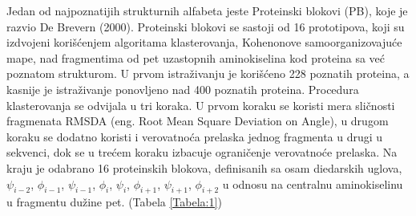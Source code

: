 \documentclass[a4paper,12pt]{article}
\begin{document}
Jedan od najpoznatijih strukturnih alfabeta jeste Proteinski blokovi (PB), koje je razvio De Brevern (2000). Proteinski blokovi se sastoji od 16 prototipova, koji su izdvojeni korišćenjem algoritama klasterovanja, Kohenonove samoorganizovajuće mape, nad fragmentima od pet uzastopnih aminokiselina kod proteina sa već poznatom strukturom. U prvom istraživanju je korišćeno 228 poznatih proteina, a kasnije je istraživanje ponovljeno nad 400 poznatih proteina. Procedura klasterovanja se odvijala u tri koraka. U prvom koraku se koristi mera sličnosti fragmenata RMSDA (eng. Root Mean Square Deviation on Angle), u drugom koraku se dodatno koristi i verovatnoća prelaska jednog fragmenta u drugi u sekvenci, dok se u trećem koraku izbacuje ograničenje verovatnoće prelaska. Na kraju je odabrano 16 proteinskih blokova, definisanih sa osam diedarskih uglova, $\psi_{i-2}$, $\phi_{i-1}$, $\psi_{i-1}$, $\phi_i$, $\psi_i$, $\phi_{i+1}$, $\psi_{i+1}$, $\phi_{i+2}$ u odnosu na centralnu aminokiselinu u fragmentu dužine pet. \cite{joseph2010biohysrev} (Tabela \ref{Tabela:1})
\\
\end{document}
